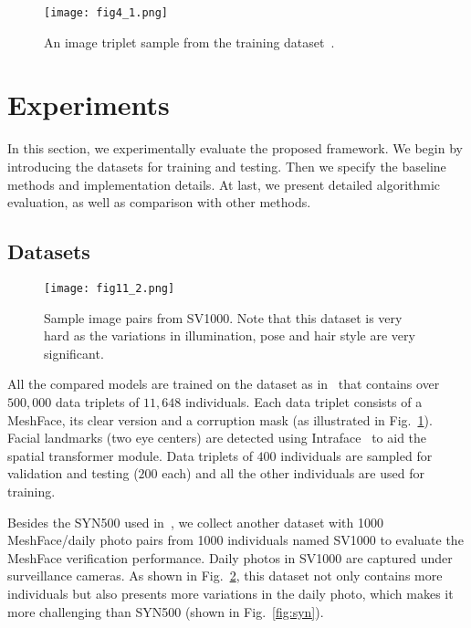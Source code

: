 \documentclass[10pt,twocolumn,letterpaper]{article}
\begin{document}
\begin{figure}
  \centering
    \texttt{[image: fig4\_1.png]}
    \caption{An image triplet sample from the training dataset~\cite{7550058}.}
    \label{fig:dataset} %
\end{figure}




\section{Experiments}

In this section, we experimentally evaluate the proposed framework. We begin by introducing the datasets for training and testing. Then we specify the baseline methods and implementation details. At last, we present detailed algorithmic evaluation, as well as comparison with other methods.

\subsection{Datasets}

\begin{figure}
  \centering
    \texttt{[image: fig11\_2.png]}
    \caption{Sample image pairs from SV1000. Note that this dataset is very hard as the variations in illumination, pose and hair style are very significant.}
    \label{fig:sv} %
\end{figure}


All the compared models are trained on the dataset as in~\cite{7550058} that contains over $500,000$ data triplets of $11,648$ individuals. Each data triplet consists of a MeshFace, its clear version and a corruption mask (as illustrated in Fig.~\ref{fig:dataset}). Facial landmarks (two eye centers) are detected using Intraface~\cite{XiongD13} to aid the spatial transformer module. Data triplets of $400$ individuals are sampled for validation and testing ($200$ each) and all the other individuals are used for training.

Besides the SYN500 used in~\cite{7550058}, we collect another dataset with 1000 MeshFace/daily photo pairs from 1000 individuals named SV1000 to evaluate the MeshFace verification performance. Daily photos in SV1000 are captured under surveillance cameras. As shown in Fig.~\ref{fig:sv}, this dataset not only contains more individuals but also presents more variations in the daily photo, which makes it more challenging than SYN500 (shown in Fig.~\ref{fig:syn}).
\end{document}
